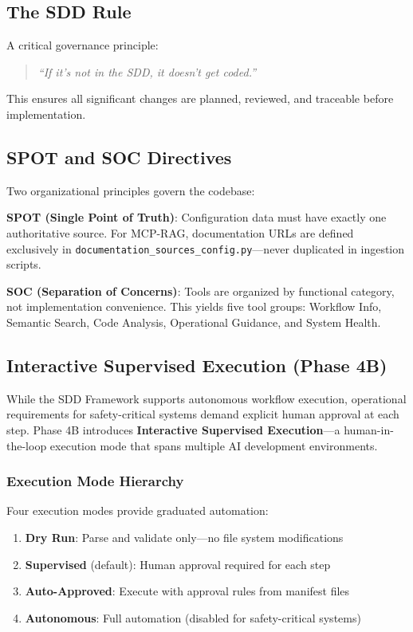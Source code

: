 \documentclass[11pt,letterpaper]{article}
\begin{document}
\subsection{The SDD Rule}

A critical governance principle:

\begin{quote}
    \textit{``If it's not in the SDD, it doesn't get coded.''}
\end{quote}

This ensures all significant changes are planned, reviewed, and traceable before implementation.

\subsection{SPOT and SOC Directives}

Two organizational principles govern the codebase:

\textbf{SPOT (Single Point of Truth)}: Configuration data must have exactly one authoritative source. For MCP-RAG, documentation URLs are defined exclusively in \texttt{documentation\_sources\_config.py}---never duplicated in ingestion scripts.

\textbf{SOC (Separation of Concerns)}: Tools are organized by functional category, not implementation convenience. This yields five tool groups: Workflow Info, Semantic Search, Code Analysis, Operational Guidance, and System Health.

\subsection{Interactive Supervised Execution (Phase 4B)}

While the SDD Framework supports autonomous workflow execution, operational requirements for safety-critical systems demand explicit human approval at each step. Phase 4B introduces \textbf{Interactive Supervised Execution}---a human-in-the-loop execution mode that spans multiple AI development environments.

\subsubsection{Execution Mode Hierarchy}

Four execution modes provide graduated automation:

\begin{enumerate}
    \item \textbf{Dry Run}: Parse and validate only---no file system modifications
    \item \textbf{Supervised} (default): Human approval required for each step
    \item \textbf{Auto-Approved}: Execute with approval rules from manifest files
    \item \textbf{Autonomous}: Full automation (disabled for safety-critical systems)
\end{enumerate}
\end{document}
